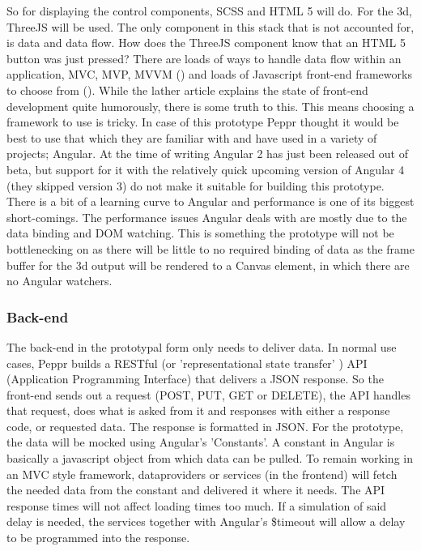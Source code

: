 So for displaying the control components, SCSS and HTML 5 will do. For the 3d, ThreeJS will be used. The only component in this stack that is not accounted for, is data and data flow. How does the ThreeJS component know that an HTML 5 button was just pressed? There are loads of ways to handle data flow within an application, MVC, MVP, MVVM (\cite{MVCMVPMVVM}) and loads of Javascript front-end frameworks to choose from (\cite{javascriptAnno2016}). While the lather article explains the state of front-end development quite humorously, there is some truth to this. This means choosing a framework to use is tricky. In case of this prototype Peppr thought it would be best to use that which they are familiar with and have used in a variety of projects; Angular. At the time of writing Angular 2 has just been released out of beta, but support for it with the relatively quick upcoming version of Angular 4 (they skipped version 3) do not make it suitable for building this prototype.
There is a bit of a learning curve to Angular and performance is one of its biggest short-comings. The performance issues Angular deals with are mostly due to the data binding and DOM watching. This is something the prototype will not be bottlenecking on as there will be little to no required binding of data as the frame buffer for the 3d output will be rendered to a Canvas element, in which there are no Angular watchers.

\subsubsection{Back-end}
\label{subsub: backEnd}
The back-end in the prototypal form only needs to deliver data. In normal use cases, Peppr builds a RESTful (or 'representational state transfer' \cite{RESTful} ) API (Application Programming Interface) that delivers a JSON response. So the front-end sends out a request (POST, PUT, GET or DELETE), the API handles that request, does what is asked from it and responses with either a response code, or requested data. The response is formatted in JSON. 
For the prototype, the data will be mocked using Angular's 'Constants'. A constant in Angular is basically a javascript object from which data can be pulled. To remain working in an MVC style framework, dataproviders or services (in the frontend) will fetch the needed data from the constant and delivered it where it needs. The API response times will not affect loading times too much. If a simulation of said delay is needed, the services together with Angular's \$timeout will allow a delay to be programmed into the response.

